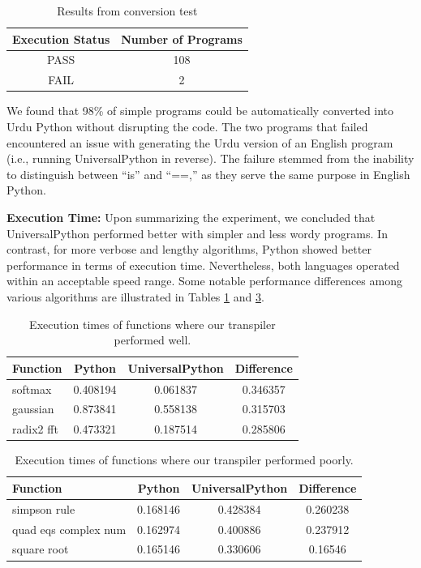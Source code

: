 \documentclass[conference]{IEEEtran}
\begin{document}
\begin{table}[h]
\centering
\caption{Results from conversion test}
\vspace{3mm}
\label{tab:execution_results}
\begin{tabular}{cc}
\hline
 Execution Status & Number of Programs \\
\hline
 PASS & 108 \\
 FAIL & 2 \\
\hline
\end{tabular}
\end{table}



We found that 98\% of simple programs could be automatically converted into Urdu Python without disrupting the code. The two programs that failed encountered an issue with generating the Urdu version of an English program (i.e., running UniversalPython in reverse). The failure stemmed from the inability to distinguish between “is” and “==,” as they serve the same purpose in English Python.

\textbf{Execution Time:} Upon summarizing the experiment, we concluded that UniversalPython performed better with simpler and less wordy programs. In contrast, for more verbose and lengthy algorithms, Python showed better performance in terms of execution time. Nevertheless, both languages operated within an acceptable speed range. Some notable performance differences among various algorithms are illustrated in Tables \ref{tab:execution_results} and \ref{tab:execution_times_poor}.

\begin{table}[h]
\centering
\caption{Execution times of functions where our transpiler performed well.}
\vspace{3mm}
\label{tab:execution_times} 
\begin{tabular}{lccc}
\hline
 Function & Python & UniversalPython & Difference \\
\hline
 softmax & 0.408194 & 0.061837 & 0.346357 \\
 gaussian & 0.873841 & 0.558138 & 0.315703 \\
 radix2 fft & 0.473321 & 0.187514 & 0.285806 \\ 
\hline
\end{tabular}
\end{table}

  \begin{table}[h]
\centering
\caption{Execution times of functions where our transpiler performed poorly.}
\vspace{3mm}
\label{tab:execution_times_poor} 
\begin{tabular}{lccc}
\hline
 Function & Python & UniversalPython & Difference \\
\hline
 simpson rule & 0.168146 & 0.428384 & 0.260238 \\
 quad eqs complex num & 0.162974 & 0.400886 & 0.237912 \\
 square root & 0.165146 & 0.330606 & 0.16546 \\ 
\hline
\end{tabular}
\end{table}
\end{document}
